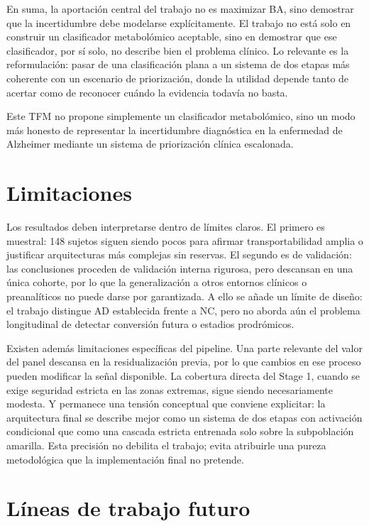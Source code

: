En suma, la aportación central del trabajo no es maximizar BA, sino demostrar que la incertidumbre debe modelarse explícitamente. El trabajo no está solo en construir un clasificador metabolómico aceptable, sino en demostrar que ese clasificador, por sí solo, no describe bien el problema clínico. Lo relevante es la reformulación: pasar de una clasificación plana a un sistema de dos etapas más coherente con un escenario de priorización, donde la utilidad depende tanto de acertar como de reconocer cuándo la evidencia todavía no basta.

Este TFM no propone simplemente un clasificador metabolómico, sino un modo más honesto de representar la incertidumbre diagnóstica en la enfermedad de Alzheimer mediante un sistema de priorización clínica escalonada.

\section{Limitaciones}

Los resultados deben interpretarse dentro de límites claros. El primero es muestral: 148 sujetos siguen siendo pocos para afirmar transportabilidad amplia o justificar arquitecturas más complejas sin reservas. El segundo es de validación: las conclusiones proceden de validación interna rigurosa, pero descansan en una única cohorte, por lo que la generalización a otros entornos clínicos o preanalíticos no puede darse por garantizada. A ello se añade un límite de diseño: el trabajo distingue AD establecida frente a NC, pero no aborda aún el problema longitudinal de detectar conversión futura o estadios prodrómicos.

Existen además limitaciones específicas del pipeline. Una parte relevante del valor del panel descansa en la residualización previa, por lo que cambios en ese proceso pueden modificar la señal disponible. La cobertura directa del Stage 1, cuando se exige seguridad estricta en las zonas extremas, sigue siendo necesariamente modesta. Y permanece una tensión conceptual que conviene explicitar: la arquitectura final se describe mejor como un sistema de dos etapas con activación condicional que como una cascada estricta entrenada solo sobre la subpoblación amarilla. Esta precisión no debilita el trabajo; evita atribuirle una pureza metodológica que la implementación final no pretende.

\section{Líneas de trabajo futuro}

